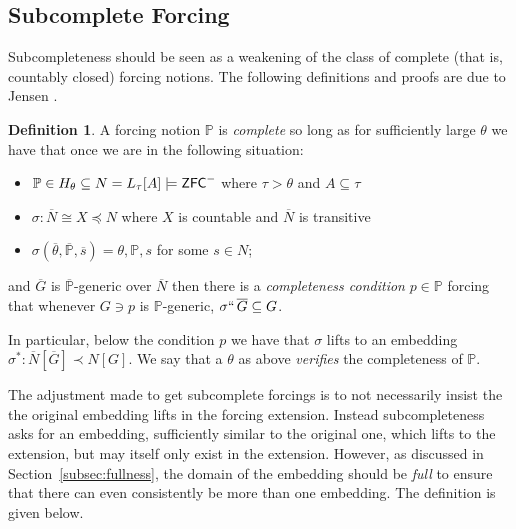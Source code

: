 \documentclass{amsart}
\theoremstyle{definition}
\newtheorem{definition}[theorem]{Definition}
\theoremstyle{remark}
\renewcommand{\P}{\mathbb{P}}
\newcommand{\N}{{\overline{N}}}
\newcommand{\G}{\overline{G}}
\newcommand{\ZFC}{\textup{\ensuremath{\textsf{ZFC}}}}
\begin{document}
\subsection{Subcomplete Forcing} \label{subsec:subcomplete}
Subcompleteness should be seen as a weakening of the class of complete (that is, countably closed) forcing notions. The following definitions and proofs are due to Jensen \cite[Chapter 3]{Jensen:2012fr}.
 
\begin{definition} A forcing notion $\P$ is \emph{complete} so long as
for sufficiently large $\theta$ we have that once we are in the following situation: \begin{itemize}
	\item $\P \in H_\theta \subseteq N = L_\tau[A] \models \ZFC^-$ where $\tau>\theta$ and $A \subseteq \tau$
	\item $\sigma: \N \cong X \preccurlyeq N$ where $X$ is countable and $\N$ is transitive
	\item $\sigma(\overline \theta, \overline{\P}, \overline s)=\theta, \P, s$ for some $s \in N$;
\end{itemize}
and $\G$ is $\overline{\P}$-generic over $\N$ then there is a \emph{completeness condition} $p \in \P$ forcing that whenever $G \ni p$ is $\P$-generic, $\sigma ``\, \G \subseteq G$. 

In particular, below the condition $p$ we have that $\sigma$ lifts to an embedding $\sigma^*:\N[\G] \prec N[G]$.
We say that a $\theta$ as above \emph{verifies} the completeness of $\P$.
\end{definition}
The adjustment made to get subcomplete forcings is to not necessarily insist the the original embedding lifts in the forcing extension. Instead subcompleteness asks for an embedding, sufficiently similar
to the original one, which lifts to the extension, but may itself only exist in the extension.
However, as discussed in Section~\ref{subsec:fullness}, the domain of the embedding should be \emph{full} to ensure that there can even consistently be more than one embedding. The definition is given below.
\end{document}
